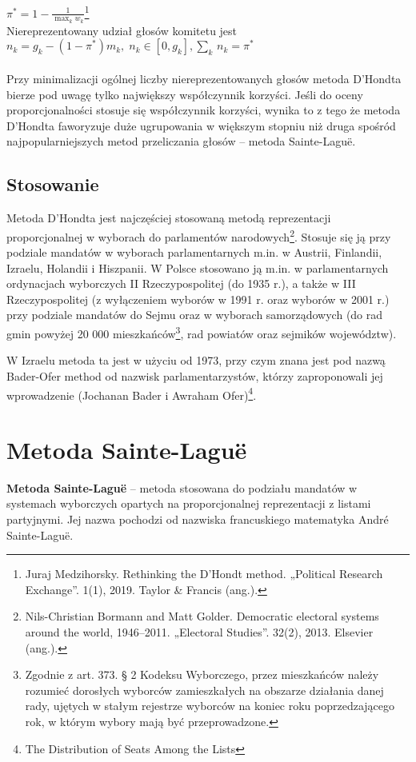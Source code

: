 \documentclass[12pt,a4paper,titlepage]{report}
\begin{document}
\begin{math}\pi ^{*}=1-{\frac {1}{\max _{k}w_{k}}}\end{math}\footnote[2]{Juraj Medzihorsky. Rethinking the D’Hondt method. „Political Research Exchange”. 1(1), 2019. Taylor \& Francis (ang.).} \\
Niereprezentowany udział głosów komitetu jest
\begin{math} n_{k}=g_{k}-(1-\pi ^{*})m_{k},\;n_{k}\in [0,g_{k}],\sum _{k}\,n_{k}=\pi ^{*}\end{math}\footnotemark[2]
 \\ \\
Przy minimalizacji ogólnej liczby niereprezentowanych głosów metoda D’Hondta bierze pod uwagę tylko największy współczynnik korzyści. Jeśli do oceny proporcjonalności stosuje się współczynnik korzyści, wynika to z tego że metoda D’Hondta faworyzuje duże ugrupowania w większym stopniu niż druga spośród najpopularniejszych metod przeliczania głosów – metoda Sainte-Laguë.
\newpage
\section{Stosowanie}
Metoda D’Hondta jest najczęściej stosowaną metodą reprezentacji proporcjonalnej w wyborach do parlamentów narodowych\footnote[3]{Nils-Christian Bormann and Matt Golder. Democratic electoral systems around the world, 1946--2011. „Electoral Studies”. 32(2), 2013. Elsevier (ang.).}. Stosuje się ją przy podziale mandatów w wyborach parlamentarnych m.in. w Austrii, Finlandii, Izraelu, Holandii i Hiszpanii. W Polsce stosowano ją m.in. w parlamentarnych ordynacjach wyborczych II Rzeczypospolitej (do 1935 r.), a także w III Rzeczypospolitej (z wyłączeniem wyborów w 1991 r. oraz wyborów w 2001 r.) przy podziale mandatów do Sejmu oraz w wyborach samorządowych (do rad gmin powyżej 20 000 mieszkańców\footnote[4]{ Zgodnie z art. 373. § 2 Kodeksu Wyborczego, przez mieszkańców należy rozumieć dorosłych wyborców zamieszkałych na obszarze działania danej rady, ujętych w stałym rejestrze wyborców na koniec roku poprzedzającego rok, w którym wybory mają być przeprowadzone.}, rad powiatów oraz sejmików województw).

W Izraelu metoda ta jest w użyciu od 1973, przy czym znana jest pod nazwą Bader-Ofer method od nazwisk parlamentarzystów, którzy zaproponowali jej wprowadzenie (Jochanan Bader i Awraham Ofer)\footnote[5]{The Distribution of Seats Among the Lists}.
\newpage
\chapter{Metoda Sainte-Laguë}
\textbf{Metoda Sainte-Laguë} – metoda stosowana do podziału mandatów w systemach wyborczych opartych na proporcjonalnej reprezentacji z listami partyjnymi. Jej nazwa pochodzi od nazwiska francuskiego matematyka André Sainte-Laguë.
\end{document}
